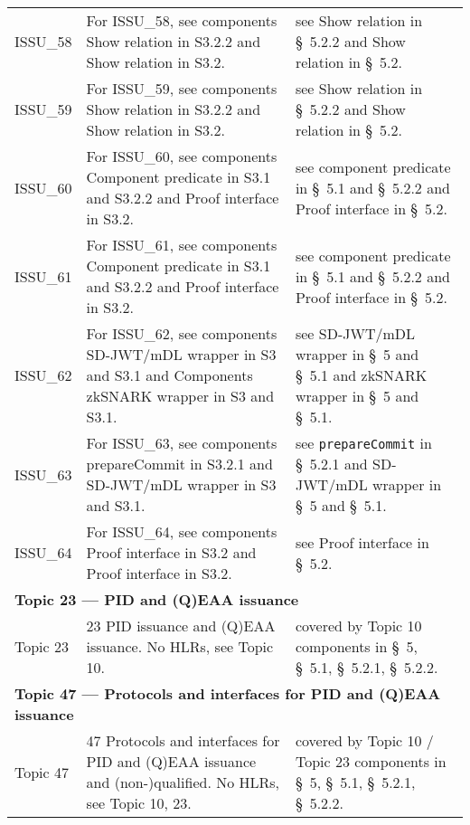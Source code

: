 \begin{landscape}
\begin{longtable}{p{3cm} p{10cm} p{7cm}}
ISSU\_58 &
For ISSU\_58, see components Show relation in S3.2.2 and Show relation in S3.2. &
see Show relation in \S~5.2.2 and Show relation in \S~5.2. \\

ISSU\_59 &
For ISSU\_59, see components Show relation in S3.2.2 and Show relation in S3.2. &
see Show relation in \S~5.2.2 and Show relation in \S~5.2. \\

ISSU\_60 &
For ISSU\_60, see components Component predicate in S3.1 and S3.2.2 and Proof interface in S3.2. &
see component predicate in \S~5.1 and \S~5.2.2 and Proof interface in \S~5.2. \\

ISSU\_61 &
For ISSU\_61, see components Component predicate in S3.1 and S3.2.2 and Proof interface in S3.2. &
see component predicate in \S~5.1 and \S~5.2.2 and Proof interface in \S~5.2. \\

ISSU\_62 &
For ISSU\_62, see components SD-JWT/mDL wrapper in S3 and S3.1 and Components zkSNARK wrapper in S3 and S3.1. &
see SD-JWT/mDL wrapper in \S~5 and \S~5.1 and zkSNARK wrapper in \S~5 and \S~5.1. \\

ISSU\_63 &
For ISSU\_63, see components prepareCommit in S3.2.1 and SD-JWT/mDL wrapper in S3 and S3.1. &
see \texttt{prepareCommit} in \S~5.2.1 and SD-JWT/mDL wrapper in \S~5 and \S~5.1. \\

ISSU\_64 &
For ISSU\_64, see components Proof interface in S3.2 and Proof interface in S3.2. &
see Proof interface in \S~5.2. \\[1em]

\multicolumn{3}{l}{\textbf{Topic 23 — PID and (Q)EAA issuance}}\\

Topic 23 &
23 PID issuance and (Q)EAA issuance. No HLRs, see Topic 10. &
covered by Topic 10 components in \S~5, \S~5.1, \S~5.2.1, \S~5.2.2. \\[1em]

\multicolumn{3}{l}{\textbf{Topic 47 — Protocols and interfaces for PID and (Q)EAA issuance}}\\

Topic 47 &
47 Protocols and interfaces for PID and (Q)EAA issuance and (non-)qualified. No HLRs, see Topic 10, 23. &
covered by Topic 10 / Topic 23 components in \S~5, \S~5.1, \S~5.2.1, \S~5.2.2. \\[1em]


\end{longtable}
\end{landscape}

